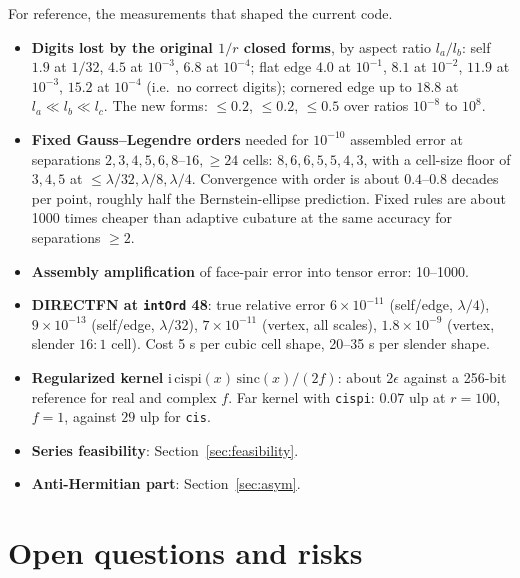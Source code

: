 \documentclass[11pt]{article}
\theoremstyle{remark}
\newcommand{\ii}{\mathrm{i}}
\newcommand{\code}[1]{\texttt{#1}}
\begin{document}
For reference, the measurements that shaped the current code.
\begin{itemize}[nosep]
\item \textbf{Digits lost by the original $1/r$ closed forms}, by aspect ratio
$l_a/l_b$: self $1.9$ at $1/32$, $4.5$ at $10^{-3}$, $6.8$ at $10^{-4}$; flat edge
$4.0$ at $10^{-1}$, $8.1$ at $10^{-2}$, $11.9$ at $10^{-3}$, $15.2$ at $10^{-4}$ (i.e.\
no correct digits); cornered edge up to $18.8$ at $l_a\ll l_b\ll l_c$. The new forms:
$\le 0.2$, $\le 0.2$, $\le 0.5$ over ratios $10^{-8}$ to $10^{8}$.
\item \textbf{Fixed Gauss--Legendre orders} needed for $10^{-10}$ assembled error at
separations $2, 3, 4, 5, 6, 8$--$16, \ge 24$ cells: $8, 6, 6, 5, 5, 4, 3$, with a
cell-size floor of $3, 4, 5$ at $\le\lambda/32, \lambda/8, \lambda/4$. Convergence
with order is about $0.4$--$0.8$ decades per point, roughly half the Bernstein-ellipse
prediction. Fixed rules are about 1000 times cheaper than adaptive cubature at the
same accuracy for separations $\ge 2$.
\item \textbf{Assembly amplification} of face-pair error into tensor error: 10--1000.
\item \textbf{DIRECTFN at \code{intOrd} 48}: true relative error $6\times 10^{-11}$
(self/edge, $\lambda/4$), $9\times 10^{-13}$ (self/edge, $\lambda/32$), $7\times 10^{-11}$
(vertex, all scales), $1.8\times 10^{-9}$ (vertex, slender $16{:}1$ cell). Cost 5 s per
cubic cell shape, 20--35 s per slender shape.
\item \textbf{Regularized kernel} $\ii\,\mathrm{cispi}(x)\,\mathrm{sinc}(x)/(2f)$:
about $2\epsilon$ against a 256-bit reference for real and complex $f$. Far kernel
with \code{cispi}: $0.07$ ulp at $r = 100$, $f = 1$, against $29$ ulp for \code{cis}.
\item \textbf{Series feasibility}: Section~\ref{sec:feasibility}.
\item \textbf{Anti-Hermitian part}: Section~\ref{sec:asym}.
\end{itemize}

\section{Open questions and risks}
\end{document}
